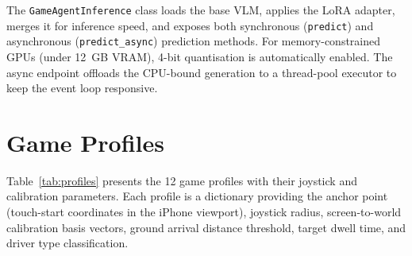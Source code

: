 \documentclass[11pt,a4paper]{article}
\begin{document}
The \texttt{GameAgentInference} class loads the base VLM, applies the LoRA adapter, merges it for inference speed, and exposes both synchronous (\texttt{predict}) and asynchronous (\texttt{predict\_async}) prediction methods. For memory-constrained GPUs (under 12~GB VRAM), 4-bit quantisation is automatically enabled. The async endpoint offloads the CPU-bound generation to a thread-pool executor to keep the event loop responsive.

\section{Game Profiles}

Table~\ref{tab:profiles} presents the 12 game profiles with their joystick and calibration parameters. Each profile is a dictionary providing the anchor point (touch-start coordinates in the iPhone viewport), joystick radius, screen-to-world calibration basis vectors, ground arrival distance threshold, target dwell time, and driver type classification.
\end{document}
